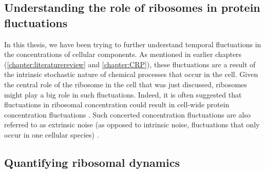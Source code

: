 \subsection*{Understanding the role of ribosomes in protein fluctuations}

In this thesis, 
we have been trying to further 
understand %
temporal fluctuations in the concentrations of cellular components.%
%
As mentioned in earlier chapters (\ref{chapter:literaturereview} and  \ref{chapter:CRP}),
these fluctuations are a result of the intrinsic stochastic nature of chemical processes that occur in the cell.
%
Given the central role of the ribosome in the cell that was just discussed, ribosomes might play a big role in such fluctuations.
Indeed, it is often suggested that fluctuations in ribosomal concentration could result in cell-wide protein concentration fluctuations \cite{Davidson2008, Raj2008, Chalancon2012, Bruggeman2018}.
%
Such concerted concentration fluctuations are also referred to as extrinsic noise (as opposed to intrinsic noise, fluctuations that only occur in one cellular species) \cite{Elowitz2002}.

\subsection*{Quantifying ribosomal dynamics}

